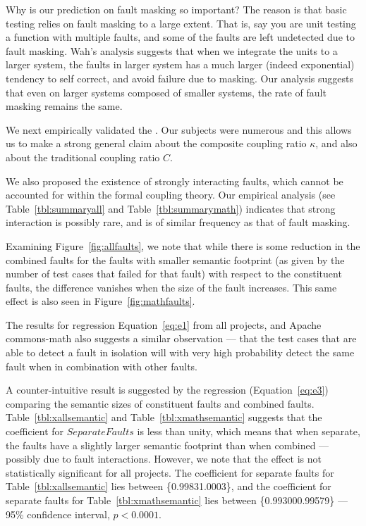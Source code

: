\documentclass[preprint,nonatbib]{sigplanconf}\usepackage[]{graphicx}\usepackage[]{color}
\begin{document}
Why is our prediction on fault masking so important? The reason is
that basic testing relies on fault masking to a large extent. That is,
say you are unit testing a function with multiple faults, and some of
the faults are left undetected due to fault masking. Wah's analysis
suggests that when we integrate the units to a larger system, the faults
in larger system has a much larger (indeed exponential) tendency to self
correct, and avoid failure due to masking. Our analysis suggests that
even on larger systems composed of smaller systems, the rate of fault
masking remains the same.

We next empirically validated the \efaultT. Our subjects were numerous
and this allows us to make a strong general claim about the composite
coupling ratio $\kappa$, and also about the traditional coupling ratio $C$.

We also proposed the existence of strongly interacting faults, which cannot
be accounted for within the formal coupling theory. Our empirical analysis
(see Table~\ref{tbl:summaryall} and Table~\ref{tbl:summarymath}) indicates
that strong interaction is possibly rare, and is of similar frequency as
that of fault masking.

Examining Figure~\ref{fig:allfaults}, we note that while there is some
reduction in the combined faults for the faults with smaller semantic footprint
(as given by the number of test cases that failed for that fault) with respect
to the constituent faults, the difference vanishes when the size of the fault
increases. This same effect is also seen in Figure~\ref{fig:mathfaults}.

The results for regression Equation~\ref{eq:e1} from all projects, and Apache
commons-math also suggests a similar observation --- that the test cases that
are able to detect a fault in isolation will with very high probability detect
the same fault when in combination with other faults.

A counter-intuitive result is suggested by the regression
(Equation~\ref{eq:e3}) comparing the semantic sizes of constituent faults and
combined faults. Table~\ref{tbl:xallsemantic} and Table~\ref{tbl:xmathsemantic}
suggests that the coefficient for $SeparateFaults$ is less than unity, which
means that when separate, the faults have a slightly larger semantic footprint
than when combined --- possibly due to fault interactions. However, we note that
the effect is not statistically significant for all projects. The coefficient
for separate faults for Table~\ref{tbl:xallsemantic} lies between
\{0.99831.0003\}, and the
coefficient for separate faults for Table~\ref{tbl:xmathsemantic} lies between
\{0.993000.99579\} --- 95\% confidence
interval, $p < 0.0001$.
\end{document}
